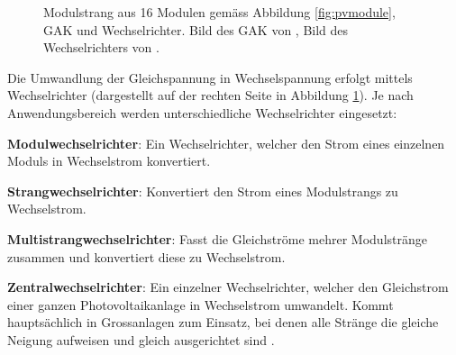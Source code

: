 \begin{figure}[h!t]
    \centering
    \caption{%
        Modulstrang aus 16 Modulen  gem\"ass Abbildung \ref{fig:pvmodule}, GAK
        und Wechselrichter. Bild des GAK  von \cite{ref:gak:gantner}, Bild des
        Wechselrichters von \cite{ref:inverter:sunnyboy}.%
    }
    \label{fig:pvarray:gak:inverter}
\end{figure}

Die    Umwandlung    der    Gleichspannung    in    Wechselspannung    erfolgt
mittels    Wechselrichter   (dargestellt    auf   der    rechten   Seite    in
Abbildung    \ref{fig:pvarray:gak:inverter}). Je     nach    Anwendungsbereich
werden  unterschiedliche  Wechselrichter  eingesetzt:

\begin{symbols}
    \firmlist
    \item[\textbf{Modulwechselrichter}:]
        Ein  Wechselrichter,  welcher  den  Strom eines  einzelnen  Moduls  in
        Wechselstrom konvertiert.
    \item[\textbf{Strangwechselrichter}:]
        Konvertiert den Strom eines Modulstrangs zu Wechselstrom.
    \item[\textbf{Multistrangwechselrichter}:]
        Fasst   die   Gleichstr\"ome   mehrer  Modulstr\"ange   zusammen   und
        konvertiert diese zu Wechselstrom.
    \item[\textbf{Zentralwechselrichter}:]
        Ein  einzelner Wechselrichter,  welcher den  Gleichstrom einer  ganzen
        Photovoltaikanlage in Wechselstrom umwandelt. Kommt haupts\"achlich in
        Grossanlagen zum Einsatz, bei denen alle Str\"ange die gleiche Neigung
        aufweisen und gleich ausgerichtet sind \cite{ref:pv:ratgeber}.
\end{symbols}

